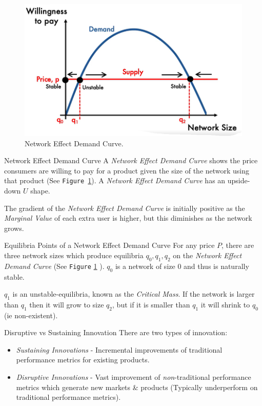\documentclass[11pt,a4paper]{article}
\begin{document}
  \begin{figure}[ht!]
    \centering
    \includegraphics[width=.5\textwidth]{networkDemandCurve.PNG}
    \caption{Network Effect Demand Curve.}
    \label{fig_NetworkEffectDemandCurve}
  \end{figure}

  \begin{definition}{Network Effect Demand Curve}
    A \textit{Network Effect Demand Curve} shows the price consumers are willing to pay for a product given the size of the network using that product (See \texttt{Figure \ref{fig_NetworkEffectDemandCurve}}). A \textit{Network Effect Demand Curve} has an upside-down $U$ shape.
    \par The gradient of the \textit{Network Effect Demand Curve} is initially positive as the \textit{Marginal Value} of each extra user is higher, but this diminishes as the network grows.
  \end{definition}

  \begin{proposition}{Equilibria Points of a Network Effect Demand Curve}
    For any price $P$, there are three network sizes which produce equilibria $q_0,q_1,q_2$ on the \textit{Network Effect Demand Curve} (See \texttt{Figure} \ref{fig_NetworkEffectDemandCurve} ). $q_0$ is a network of size $0$ and thus is naturally stable.
    \par $q_1$ is an unstable-equilibria, known as the \textit{Critical Mass}. If the network is larger than $q_1$ then it will grow to size $q_2$, but if it is smaller than $q_1$ it will shrink to $q_0$ (ie non-existent).
  \end{proposition}

  \begin{definition}{Disruptive vs Sustaining Innovation}
    There are two types of innovation:
    \begin{itemize}
      \item \textit{Sustaining Innovations} - Incremental improvements of traditional performance metrics for existing products.
      \item \textit{Disruptive Innovations} - Vast improvement of \textit{non}-traditional performance metrics which generate new markets \& products (Typically underperform on traditional performance metrics).
    \end{itemize}
  \end{definition}
\end{document}
